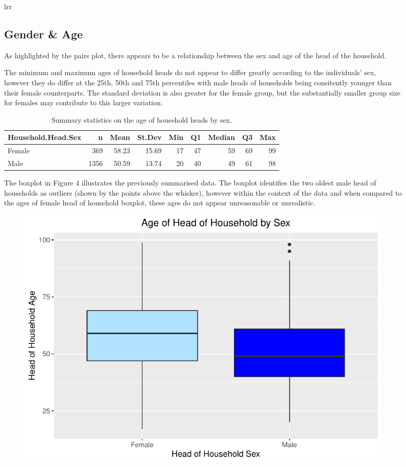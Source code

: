 \documentclass[
]{article}
\begin{document}
\begin{figure}[H]
\begin{table}[H]
\begin{tabular}[t]{lrr}
\hypertarget{gender-age}{%
\subsection{Gender \& Age}\label{gender-age}}

As highlighted by the pairs plot, there appears to be a relationship
between the sex and age of the head of the household.

The minimum and maximum ages of household heads do not appear to differ
greatly according to the individuals' sex, however they do differ at the
25th, 50th and 75th percentiles with male heads of households being
consitently younger than their female counterparts. The standard
deviation is also greater for the female group, but the substantially
smaller group size for females may contribute to this larger variation.

\begin{table}[!h]

\caption{\label{tab:summaries of age by sex}Summary statistics on the age of household heads by sex.}
\centering
\begin{tabular}[t]{l|r|r|r|r|r|r|r|r}
\hline
Household.Head.Sex & n & Mean & St.Dev & Min & Q1 & Median & Q3 & Max\\
\hline
Female & 369 & 58.23 & 15.69 & 17 & 47 & 59 & 69 & 99\\
\hline
Male & 1356 & 50.59 & 13.74 & 20 & 40 & 49 & 61 & 98\\
\hline
\end{tabular}
\end{table}

The boxplot in Figure 4 illustrates the previously summarised data. The
boxplot identifies the two oldest male head of households as outliers
(shown by the points above the whisker), however within the context of
the data and when compared to the ages of female head of household
boxplot, these ages do not appear unreasonable or unrealistic.

\begin{figure}

{\centering \includegraphics[width=0.8\linewidth]{Group_01_Project2_demo_files/figure-latex/boxplot of age by gender-1} 

}
\end{figure}
\end{tabular}
\end{table}
\end{figure}
\end{document}
